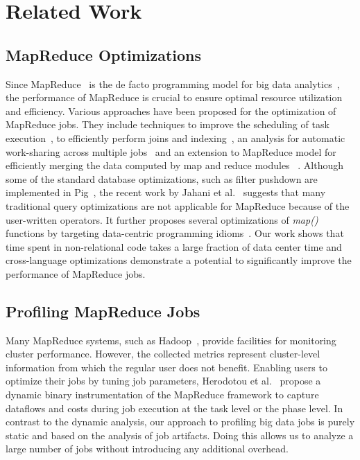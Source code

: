 \section{Related Work}

\subsection{MapReduce Optimizations}
Since MapReduce~\cite{Dean:2008} is the de facto programming model for big data analytics~\cite{Gates:2009}, the performance of MapReduce is crucial to ensure optimal resource utilization and efficiency.
Various approaches have been proposed for the optimization of MapReduce jobs.
They include techniques to improve the scheduling of task execution~\cite{Isard:2009,Zaharia:2008}, to efficiently perform joins and indexing~\cite{Dittrich:2010,Floratou:2011}, an analysis for automatic work-sharing across multiple jobs~\cite{Nykiel:2010} and an extension to MapReduce model for efficiently merging the data computed by map and reduce modules~\cite{Yang:2007} . Although some of the standard database optimizations, such as filter pushdown are implemented in Pig~\cite{Olston:2008}, the recent work by Jahani et al.~\cite{Jahani:2011} suggests that many traditional query optimizations are not applicable for MapReduce because of the user-written operators. It further proposes several optimizations of \emph{map()} functions by targeting data-centric programming idioms~\cite{Jahani:2011}. Our work shows that time spent in non-relational code takes a large fraction of data center time and cross-language optimizations demonstrate a potential to significantly improve the performance of MapReduce jobs.

\subsection{Profiling MapReduce Jobs}
Many MapReduce systems, such as Hadoop~\cite{hadoop_stream}, provide facilities for monitoring cluster performance.
However, the collected metrics represent cluster-level information from which the regular user does not benefit.
Enabling users to optimize their jobs by tuning job parameters, Herodotou et al.~\cite{Herodotou} propose a dynamic binary instrumentation of the MapReduce framework to capture dataflows and costs during job execution at the task level or the phase level.
In contrast to the dynamic analysis, our approach to profiling big data jobs is purely static and based on the analysis of job artifacts. Doing this allows us to analyze a large number of jobs without introducing any additional overhead. 

